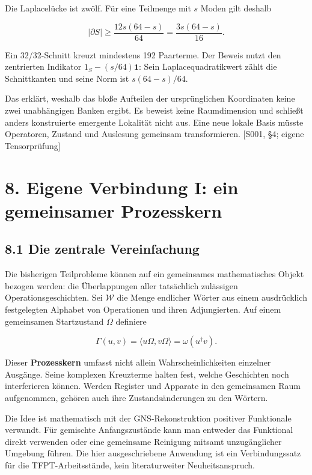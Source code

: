 Die Laplacelücke ist zwölf. Für eine Teilmenge mit \(s\) Moden gilt
deshalb

\[|\partial S|\ge \frac{12s(64-s)}{64}
=\frac{3s(64-s)}{16}.\]

Ein 32/32-Schnitt kreuzt mindestens 192 Paarterme. Der Beweis nutzt den
zentrierten Indikator \(1_S-(s/64)\mathbf1\): Sein Laplacequadratikwert
zählt die Schnittkanten und seine Norm ist \(s(64-s)/64\).

Das erklärt, weshalb das bloße Aufteilen der ursprünglichen Koordinaten
keine zwei unabhängigen Banken ergibt. Es beweist keine Raumdimension
und schließt anders konstruierte emergente Lokalität nicht aus. Eine
neue lokale Basis müsste Operatoren, Zustand und Auslesung gemeinsam
transformieren. {[}S001, §4; eigene Tensorprüfung{]}

\section{8. Eigene Verbindung I: ein gemeinsamer
Prozesskern}\label{eigene-verbindung-i-ein-gemeinsamer-prozesskern}

\subsection{8.1 Die zentrale
Vereinfachung}\label{die-zentrale-vereinfachung}

Die bisherigen Teilprobleme können auf ein gemeinsames mathematisches
Objekt bezogen werden: die Überlappungen aller tatsächlich zulässigen
Operationsgeschichten. Sei \(\mathcal W\) die Menge endlicher Wörter aus
einem ausdrücklich festgelegten Alphabet von Operationen und ihren
Adjungierten. Auf einem gemeinsamen Startzustand \(\Omega\) definiere

\[\boxed{\Gamma(u,v)=\langle u\Omega,v\Omega\rangle
=\omega(u^\dagger v).}\]

Dieser \textbf{Prozesskern} umfasst nicht allein Wahrscheinlichkeiten
einzelner Ausgänge. Seine komplexen Kreuzterme halten fest, welche
Geschichten noch interferieren können. Werden Register und Apparate in
den gemeinsamen Raum aufgenommen, gehören auch ihre Zustandsänderungen
zu den Wörtern.

Die Idee ist mathematisch mit der GNS-Rekonstruktion positiver
Funktionale verwandt. Für gemischte Anfangszustände kann man entweder
das Funktional direkt verwenden oder eine gemeinsame Reinigung mitsamt
unzugänglicher Umgebung führen. Die hier ausgeschriebene Anwendung ist
ein Verbindungssatz für die TFPT-Arbeitsstände, kein literaturweiter
Neuheitsanspruch.

